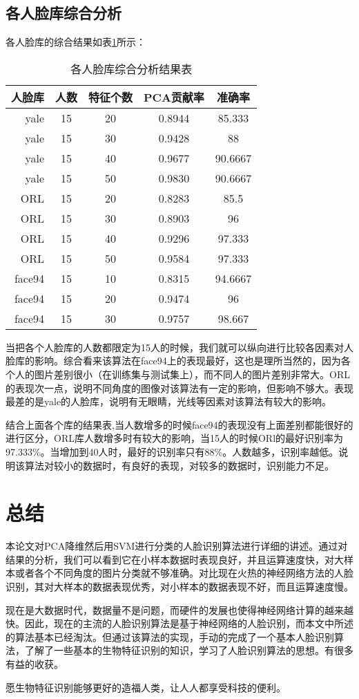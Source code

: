 \documentclass[a4paper,12pt]{ctexart}
\begin{document}
\subsection{各人脸库综合分析}

各人脸库的综合结果如表\ref{tab:zhonghe}所示：

\begin{table}[!htb]
  \centering
\begin{tabular}{|r|c|c|c|c|}
\hline
人脸库&人数&特征个数&PCA贡献率&准确率\\
\hline
yale&   15&     20&     0.8944& 85.333\\
yale&   15&     30&     0.9428& 88\\
yale&   15&     40&     0.9677& 90.6667\\
yale&   15&     50&     0.9830& 90.6667\\
\hline
ORL&    15&     20&     0.8283  &85.5\\
ORL&    15&     30&     0.8903  &96\\
ORL&    15&     40&     0.9296  &97.333\\
ORL&    15&     50&     0.9584  &97.333\\
\hline
face94& 15&     10&     0.8315& 94.6667\\
face94& 15&     20&     0.9474& 96\\
face94& 15&     30&     0.9757& 98.667\\
\hline
\end{tabular}
  \caption{各人脸库综合分析结果表}
  \label{tab:zhonghe}
\end{table}

当把各个人脸库的人数都限定为15人的时候，我们就可以纵向进行比较各因素对人脸库的影响。综合看来该算法在face94上的表现最好，这也是理所当然的，因为各个人的图片差别很小（在训练集与测试集上），而不同人的图片差别非常大。ORL的表现次一点，说明不同角度的图像对该算法有一定的影响，但影响不够大。表现最差的是yale的人脸库，说明有无眼睛，光线等因素对该算法有较大的影响。

结合上面各个库的结果表,当人数增多的时候face94的表现没有上面差别都能很好的进行区分，ORL库人数增多时有较大的影响，当15人的时候ORl的最好识别率为97.333\%。当增加到40人时，最好的识别率只有88\%。人数越多，识别率越低。说明该算法对较小的数据时，有良好的表现，对较多的数据时，识别能力不足。

\section{总结}

本论文对PCA降维然后用SVM进行分类的人脸识别算法进行详细的讲述。通过对结果的分析，我们可以看到它在小样本数据时表现良好，并且运算速度快，对大样本或者各个不同角度的图片分类就不够准确。对比现在火热的神经网络方法的人脸识别，其对大样本的数据表现优秀，对小样本的数据表现不好，而且运算速度慢。

现在是大数据时代，数据量不是问题，而硬件的发展也使得神经网络计算的越来越快。因此，现在的主流的人脸识别算法是基于神经网络的人脸识别，而本文中所述的算法基本已经淘汰。但通过该算法的实现，手动的完成了一个基本人脸识别算法，了解了一些基本的生物特征识别的知识，学习了人脸识别算法的思想。有很多有益的收获。

愿生物特征识别能够更好的造福人类，让人人都享受科技的便利。
\end{document}
